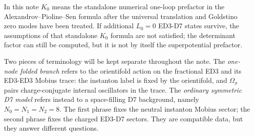 \documentclass[11pt]{article}
\newcommand{\orient}{\Omega_\sigma}
\begin{document}
In this note \(K_0\) means the standalone numerical one-loop prefactor in the
Alexandrov--Pioline--Sen formula after the universal translation and Goldstino zero modes have
been treated. If additional \(L_0=0\) ED3-D7 states survive, the assumptions of that standalone
\(K_0\) formula are not satisfied; the determinant factor can still be computed, but it is not
by itself the superpotential prefactor.

Two pieces of terminology will be kept separate throughout the note. The \emph{one-node folded
branch} refers to the orientifold action on the fractional ED3 and its ED3-ED3 Mobius trace:
the instanton label is fixed by the orientifold, and \(\orient\) pairs charge-conjugate
internal oscillators in the trace. The \emph{ordinary symmetric D7 model} refers instead to a
space-filling D7 background, namely \(N_0=N_1=N_2=8\). The first phrase fixes the neutral
instanton Mobius sector; the second phrase fixes the charged ED3-D7 sectors. They are
compatible data, but they answer different questions.
\end{document}
